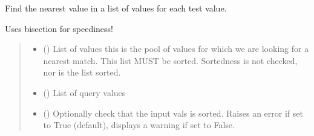 \documentclass[letterpaper,10pt,english]{sphinxmanual}
\begin{document}
\begin{fulllineitems}
\label{\detokenize{users_guide:GeoSpatialTools.neighbours.find_nearest}}
\pysigstartsignatures
{}
\pysigstopsignatures
\sphinxAtStartPar
Find the nearest value in a list of values for each test value.

\sphinxAtStartPar
Uses bisection for speediness!
\begin{quote}\begin{description}
\begin{itemize}
\item {} 
\sphinxAtStartPar
{} (\sphinxstyleliteralemphasis{\sphinxupquote{{[}}}\sphinxstyleliteralemphasis{\sphinxupquote{{]}}}) \textendash{} List of values \sphinxhyphen{} this is the pool of values for which we are looking
for a nearest match. This list MUST be sorted. Sortedness is not
checked, nor is the list sorted.

\item {} 
\sphinxAtStartPar
{} (\sphinxstyleliteralemphasis{\sphinxupquote{{[}}}\sphinxstyleliteralemphasis{\sphinxupquote{{]} }}\sphinxstyleliteralemphasis{\sphinxupquote{| }}) \textendash{} List of query values

\item {} 
\sphinxAtStartPar
{} () \textendash{} Optionally check that the input vals is sorted. Raises an error if set
to True (default), displays a warning if set to False.

\end{itemize}

\sphinxAtStartPar
{}


\end{description}
\end{quote}
\end{fulllineitems}
\end{document}
